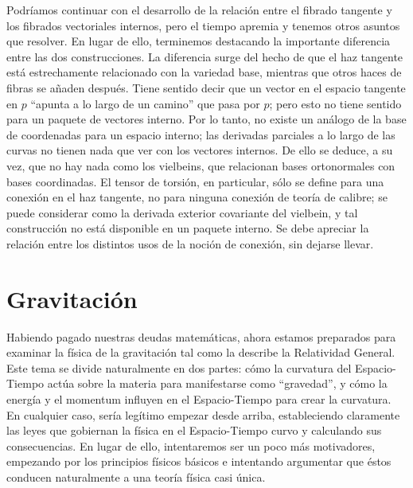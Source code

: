 \documentclass[11pt,b5paper,openany,twoside]{book}
\begin{document}
Podríamos continuar con el desarrollo de la relación entre el fibrado tangente y los fibrados vectoriales internos, pero el tiempo apremia y tenemos otros asuntos que resolver.
En lugar de ello, terminemos destacando la importante diferencia entre las dos construcciones.
La diferencia surge del hecho de que el haz tangente está estrechamente relacionado con la variedad base, mientras que otros haces de fibras se añaden después.
Tiene sentido decir que un vector en el espacio tangente en $p$ ``apunta a lo largo de un camino'' que pasa por $p$; pero esto no tiene sentido para un paquete de vectores interno.
Por lo tanto, no existe un análogo de la base de coordenadas para un espacio interno; las derivadas parciales a lo largo de las curvas no tienen nada que ver con los vectores internos.
De ello se deduce, a su vez, que no hay nada como los vielbeins, que relacionan bases ortonormales con bases coordinadas.
El tensor de torsión, en particular, sólo se define para una conexión en el haz tangente, no para ninguna conexión de teoría de calibre; se puede considerar como la derivada exterior covariante del vielbein, y tal construcción no está disponible en un paquete interno.
Se debe apreciar la relación entre los distintos usos de la noción de conexión, sin dejarse llevar.





\chapter{Gravitación}



Habiendo pagado nuestras deudas matemáticas, ahora estamos preparados para examinar la física de la gravitación tal como la describe la Relatividad General.
Este tema se divide naturalmente en dos partes: cómo la curvatura del Espacio-Tiempo actúa sobre la materia para manifestarse como ``gravedad'', y cómo la energía y el momentum influyen en el Espacio-Tiempo para crear la curvatura.
En cualquier caso, sería legítimo empezar desde arriba, estableciendo claramente las leyes que gobiernan la física en el Espacio-Tiempo curvo y calculando sus consecuencias.
En lugar de ello, intentaremos ser un poco más motivadores, empezando por los principios físicos básicos e intentando argumentar que éstos conducen naturalmente a una teoría física casi única.
\end{document}
